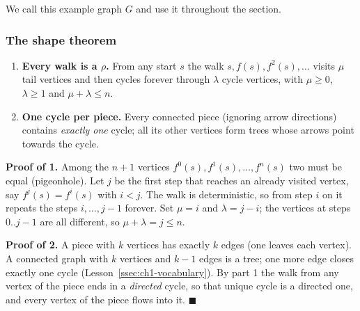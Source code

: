 We call this example graph $G$ and use it throughout the section.

\subsubsection*{The shape theorem}

\begin{theorembox}
\begin{enumerate}[leftmargin=*]
    \item \textbf{Every walk is a $\rho$.} From any start $s$ the walk $s, f(s), f^2(s), \dots$ visits $\mu$ tail vertices and then cycles forever through $\lambda$ cycle vertices, with $\mu \ge 0$, $\lambda \ge 1$ and $\mu + \lambda \le n$.
    \item \textbf{One cycle per piece.} Every connected piece (ignoring arrow directions) contains \emph{exactly one} cycle; all its other vertices form trees whose arrows point towards the cycle.
\end{enumerate}
\end{theorembox}

\textbf{Proof of 1.} Among the $n+1$ vertices $f^0(s), f^1(s), \dots, f^n(s)$ two must be equal (pigeonhole). Let $j$ be the first step that reaches an already visited vertex, say $f^j(s) = f^i(s)$ with $i < j$. The walk is deterministic, so from step $i$ on it repeats the steps $i, \dots, j-1$ forever. Set $\mu = i$ and $\lambda = j - i$; the vertices at steps $0..j-1$ are all different, so $\mu + \lambda = j \le n$.

\textbf{Proof of 2.} A piece with $k$ vertices has exactly $k$ edges (one leaves each vertex). A connected graph with $k$ vertices and $k-1$ edges is a tree; one more edge closes exactly one cycle (Lesson~\ref{ssec:ch1-vocabulary}). By part 1 the walk from any vertex of the piece ends in a \emph{directed} cycle, so that unique cycle is a directed one, and every vertex of the piece flows into it. \hfill$\blacksquare$

